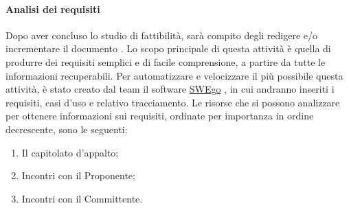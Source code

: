 \documentclass[../NormeDiProgetto.tex]{subfiles}
\begin{document}
			\paragraph{Analisi dei requisiti\\}
				Dopo aver concluso lo studio di fattibilità, sarà compito degli \analisti redigere e/o incrementare il
				documento \analisideirequisiti.
				Lo scopo principale di questa attività è quella di produrre dei requisiti semplici e di
				facile comprensione, a partire da tutte le informazioni recuperabili.
				Per automatizzare e velocizzare il più possibile questa attività, è stato creato dal
				team il software \hyperlink{SWEgo}{SWEgo} , in cui andranno inseriti i requisiti, casi d'uso e relativo tracciamento.
				Le risorse che si possono analizzare per ottenere informazioni sui requisiti, ordinate
				per importanza in ordine decrescente, sono le seguenti:
				\begin{enumerate}
					\item Il capitolato d’appalto;
					\item Incontri con il Proponente;
					\item Incontri con il Committente.
				\end{enumerate}
			
\end{document}
